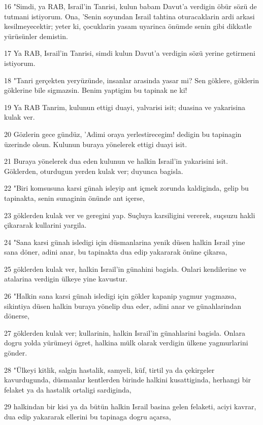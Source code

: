\par 16 "Simdi, ya RAB, Israil'in Tanrisi, kulun babam Davut'a verdigin öbür sözü de tutmani istiyorum. Ona, 'Senin soyundan Israil tahtina oturacaklarin ardi arkasi kesilmeyecektir; yeter ki, çocuklarin yasam uyarinca önümde senin gibi dikkatle yürüsünler demistin.
\par 17 Ya RAB, Israil'in Tanrisi, simdi kulun Davut'a verdigin sözü yerine getirmeni istiyorum.
\par 18 "Tanri gerçekten yeryüzünde, insanlar arasinda yasar mi? Sen göklere, göklerin göklerine bile sigmazsin. Benim yaptigim bu tapinak ne ki!
\par 19 Ya RAB Tanrim, kulunun ettigi duayi, yalvarisi isit; duasina ve yakarisina kulak ver.
\par 20 Gözlerin gece gündüz, 'Adimi oraya yerlestirecegim! dedigin bu tapinagin üzerinde olsun. Kulunun buraya yönelerek ettigi duayi isit.
\par 21 Buraya yönelerek dua eden kulunun ve halkin Israil'in yakarisini isit. Göklerden, oturdugun yerden kulak ver; duyunca bagisla.
\par 22 "Biri komsusuna karsi günah isleyip ant içmek zorunda kaldiginda, gelip bu tapinakta, senin sunaginin önünde ant içerse,
\par 23 göklerden kulak ver ve geregini yap. Suçluya karsiligini vererek, suçsuzu hakli çikararak kullarini yargila.
\par 24 "Sana karsi günah isledigi için düsmanlarina yenik düsen halkin Israil yine sana döner, adini anar, bu tapinakta dua edip yakararak önüne çikarsa,
\par 25 göklerden kulak ver, halkin Israil'in günahini bagisla. Onlari kendilerine ve atalarina verdigin ülkeye yine kavustur.
\par 26 "Halkin sana karsi günah isledigi için gökler kapanip yagmur yagmazsa, sikintiya düsen halkin buraya yönelip dua eder, adini anar ve günahlarindan dönerse,
\par 27 göklerden kulak ver; kullarinin, halkin Israil'in günahlarini bagisla. Onlara dogru yolda yürümeyi ögret, halkina mülk olarak verdigin ülkene yagmurlarini gönder.
\par 28 "Ülkeyi kitlik, salgin hastalik, samyeli, küf, tirtil ya da çekirgeler kavurdugunda, düsmanlar kentlerden birinde halkini kusattiginda, herhangi bir felaket ya da hastalik ortaligi sardiginda,
\par 29 halkindan bir kisi ya da bütün halkin Israil basina gelen felaketi, aciyi kavrar, dua edip yakararak ellerini bu tapinaga dogru açarsa,
